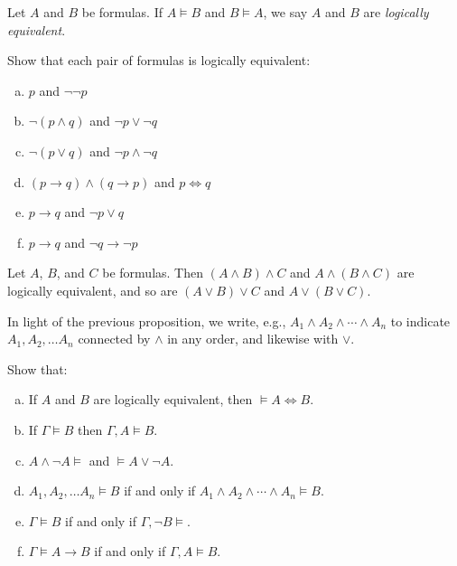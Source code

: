 \documentclass{article}
\begin{document}
\begin{definition}
    Let $A$ and $B$ be formulas. If $A \models B$ and $B \models A$, we say $A$ and $B$ are \emph{logically equivalent}.
\end{definition}

\begin{prob}{4.2}
    Show that each pair of formulas is logically equivalent:
    \begin{multicols}{2}
    \begin{enumerate}[a)]
    \item $p$ and $\neg \neg p$
    \item $\neg (p \wedge q)$ and $\neg p \vee \neg q$
    \item $\neg (p \vee q)$ and $\neg p \wedge \neg q$
    \item $(p \to q) \wedge (q \to p)$ and $p \iff q$
    \item $p \to q$ and $\neg p \vee q$
    \item $p \to q$ and $\neg q \to \neg p$
    \end{enumerate}
    \end{multicols}
\end{prob}

\begin{proposition}
    Let $A$, $B$, and $C$ be formulas. Then $(A \wedge B) \wedge C$ and $A \wedge (B \wedge C)$ are logically equivalent, and so are $(A \vee B) \vee C$ and $A \vee (B \vee C)$.
\end{proposition}

\begin{notation}
    In light of the previous proposition, we write, e.g., $A_1 \wedge A_2 \wedge \cdots \wedge A_n$ to indicate $A_1, A_2, \dots A_n$ connected by $\wedge$ in any order, and likewise with $\vee$. 
\end{notation}

\begin{prob}{4.3}
    Show that:
    \begin{enumerate}[a)]
    \item If $A$ and $B$ are logically equivalent, then $\models A \iff B$.
    \item If $\Gamma \models B$ then $\Gamma, A \models B$.
    \item $A \wedge \neg A \models$ and $\models A \vee \neg A$.
    \item $A_1, A_2, \dots A_n \models B$ if and only if $A_1 \wedge A_2 \wedge \cdots \wedge A_n \models B$.
    \item $\Gamma \models B$ if and only if $\Gamma, \neg B \models$.
    \item $\Gamma \models A \to B$ if and only if $\Gamma, A \models B$.
    \end{enumerate}
\end{prob}
\end{document}
